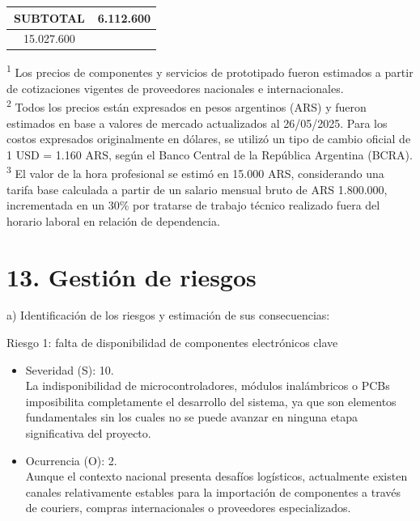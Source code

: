 \documentclass[
11pt, %
]{charter}
\begin{document}
\begin{table}[htpb]
\begin{tabularx}{\linewidth}{@{}|X|c|r|r|@{}}
\multicolumn{3}{|c|}{SUBTOTAL} &
  \multicolumn{1}{c|}{6.112.600} \\ \hline
 
\rowcolor[HTML]{C0C0C0}
\multicolumn{3}{|c|}{TOTAL} & 15.027.600
   \\ \hline
\end{tabularx}%
\end{table}

\textsuperscript{1} \footnotesize{Los precios de componentes y servicios de prototipado fueron estimados a partir de cotizaciones vigentes de proveedores nacionales e internacionales.} \\
\textsuperscript{2} \footnotesize{Todos los precios están expresados en pesos argentinos (ARS) y fueron estimados en base a valores de mercado actualizados al 26/05/2025. Para los costos expresados originalmente en dólares, se utilizó un tipo de cambio oficial de 1 USD = 1.160 ARS, según el Banco Central de la República Argentina (BCRA).}\\
\textsuperscript{3} \footnotesize {El valor de la hora profesional se estimó en 15.000 ARS, considerando una tarifa base calculada a partir de un salario mensual bruto de ARS 1.800.000, incrementada en un 30\% por tratarse de trabajo técnico realizado fuera del horario laboral en relación de dependencia.}

\section{13. Gestión de riesgos}
\label{sec:riesgos}

a) Identificación de los riesgos y estimación de sus consecuencias:

Riesgo 1: falta de disponibilidad de componentes electrónicos clave
\begin{itemize}
	\item Severidad (S): 10.\\ La indisponibilidad de microcontroladores, módulos inalámbricos o PCBs imposibilita completamente el desarrollo del sistema, ya que son elementos fundamentales sin los cuales no se puede avanzar en ninguna etapa significativa del proyecto.
	\item Ocurrencia (O): 2.\\ Aunque el contexto nacional presenta desafíos logísticos, actualmente existen canales relativamente estables para la importación de componentes a través de couriers, compras internacionales o proveedores especializados.
\end{itemize}   
\end{document}
